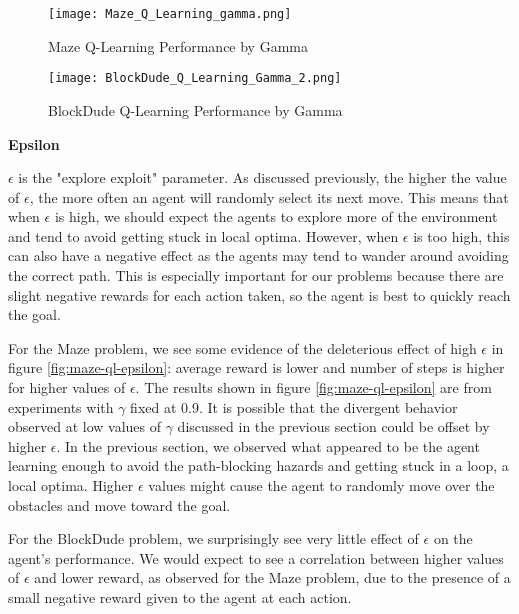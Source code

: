 \documentclass{article}
\begin{document}
\begin{figure}
    \centering
    \begin{minipage}{0.5\textwidth}
        \centering
        \texttt{[image: Maze\_Q\_Learning\_gamma.png]}
        \caption{Maze Q-Learning Performance by Gamma}
        \label{fig:maze-ql-gamma}
    \end{minipage}\hfill
    \begin{minipage}{0.5\textwidth}
        \centering
        \texttt{[image: BlockDude\_Q\_Learning\_Gamma\_2.png]}
        \caption{BlockDude Q-Learning Performance by Gamma}
        \label{fig:bd-ql-gamma}
    \end{minipage}
\end{figure}

\textbf{Epsilon}

$\epsilon$ is the "explore exploit" parameter. As discussed previously, the higher the value of $\epsilon$, the more often an agent
will randomly select its next move. This means that when $\epsilon$ is high, we should expect the agents to explore more of the environment and
tend to avoid getting stuck in local optima. However, when $\epsilon$ is too high, this can also have a negative effect as the agents may tend
to wander around avoiding the correct path. This is especially important for our problems because there are slight negative rewards for each
action taken, so the agent is best to quickly reach the goal.

For the Maze problem, we see some evidence of the deleterious effect of high $\epsilon$ in figure \ref{fig:maze-ql-epsilon}:
average reward is lower and number of steps is higher for higher values of $\epsilon$. The results shown in figure \ref{fig:maze-ql-epsilon}
are from experiments with $\gamma$ fixed at 0.9. It is possible that the divergent behavior observed at low values of $\gamma$ discussed in
the previous section could be offset by higher $\epsilon$. In the previous section, we observed what appeared to be the agent learning enough to
avoid the path-blocking hazards and getting stuck in a loop, a local optima. Higher $\epsilon$ values might cause the agent to randomly move
over the obstacles and move toward the goal.

For the BlockDude problem, we surprisingly see very little effect of $\epsilon$ on the agent's performance. We would expect to see
a correlation between higher values of $\epsilon$ and lower reward, as observed for the Maze problem, due to the presence of a small
negative reward given to the agent at each action.
\end{document}
